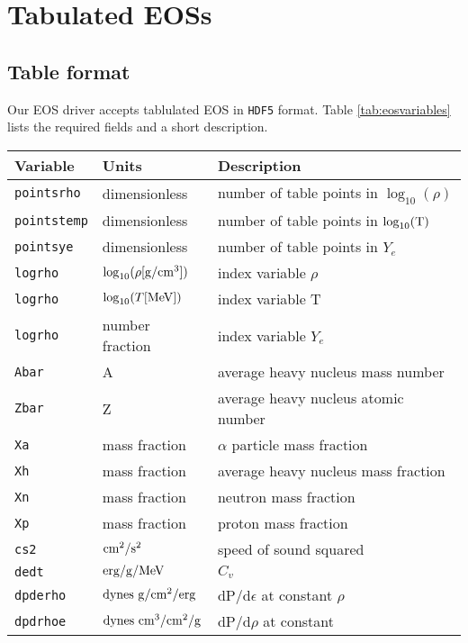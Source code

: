 \documentclass[10pt,nofootinbib]{article}
\newcommand{\code}[1]{\texttt{#1}}
\newenvironment{xaroundtbl}{\begin{flushleft}
  \renewcommand{\footnoterule}{}
  \begin{minipage}{\linewidth}
  \begin{center}}%
 {\end{center}\end{minipage}\end{flushleft}}
\begin{document}
\section{Tabulated EOSs}

\subsection{Table format}

Our EOS driver accepts tablulated EOS in \code{HDF5} format. Table
\ref{tab:eosvariables} lists the required fields and a short
description.  


\begin{table}[ht]
\begin{xaroundtbl}
\begin{tabular}{lll}
Variable & Units & Description \\[0.2mm] \hline
\code{pointsrho} & dimensionless & number of table points in
$\log_{10}(\rho)$ \\[0.2mm]
\code{pointstemp} & dimensionless & number of table points in
$\log_{10}(\rm{T})$ \\[0.2mm]
\code{pointsye} & dimensionless & number of table points in $Y_e$
\\[0.2mm]
\code{logrho} & $\log_{10}(\rho [\rm{g}/\rm{cm}^3])$ & index variable
$\rho$\\[0.2mm]
\code{logrho} & $\log_{10}(T [\rm{MeV}])$ & index variable
T\\[0.2mm]
\code{logrho} & number fraction & index variable
$Y_e$\\[0.2mm]
\code{Abar} & A & average heavy nucleus mass number\\[0.2mm]
\code{Zbar} & Z & average heavy nucleus atomic number\\[0.2mm]
\code{Xa} & mass fraction & $\alpha$ particle mass fraction\\[0.2mm]
\code{Xh} & mass fraction & average heavy nucleus mass
fraction\\[0.2mm]
\code{Xn} & mass fraction & neutron mass fraction\\[0.2mm]
\code{Xp} & mass fraction & proton mass fraction\\[0.2mm]
\code{cs2} & $\rm{cm}^2/\rm{s}^2$ & speed of sound squared\\[0.2mm]
\code{dedt} & $\rm{erg}/\rm{g}/\rm{MeV}$ & $C_v$\\[0.2mm]
\code{dpderho} & $\rm{dynes}\ \rm{g}/\rm{cm}^2/\rm{erg}$ & dP/d$\epsilon$ at constant
$\rho$\\[0.2mm]
\code{dpdrhoe} & $\rm{dynes}\ \rm{cm}^3/\rm{cm}^2/\rm{g}$ & dP/d$\rho$ at constant

\end{tabular}
\end{xaroundtbl}
\end{table}
\end{document}
